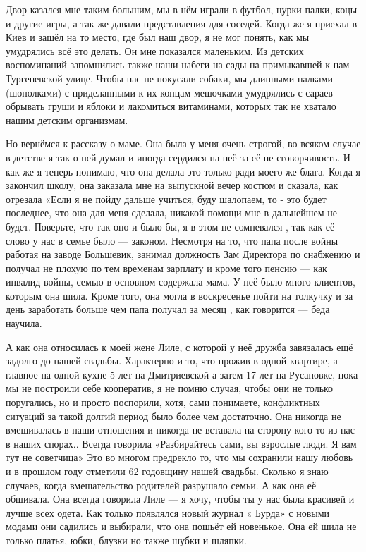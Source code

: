 Двор казался мне таким большим, мы в нём играли в футбол, цурки-палки, коцы и
другие игры,  а так же давали представления для соседей. Когда же я приехал в
Киев и зашёл на то место, где  был наш двор, я не мог понять, как мы
умудрялись всё это делать. Он мне показался маленьким. Из детских воспоминаний
запомнились также наши набеги на сады на примыкавшей к нам Тургеневской улице.
Чтобы нас не покусали собаки, мы длинными палками (шополками) с приделанными к
их концам мешочками умудрялись с сараев  обрывать груши и яблоки  и лакомиться
витаминами, которых так не хватало нашим детским организмам.

Но вернёмся к рассказу о маме. Она была у меня очень строгой, во всяком случае
в детстве я так о ней думал и иногда сердился на неё за её не сговорчивость. И
как же я теперь понимаю, что она  делала это только ради моего же блага.  Когда
я закончил школу, она заказала мне на выпускной вечер костюм и сказала, как
отрезала «Если я не пойду дальше учиться, буду шалопаем, то - это  будет
последнее, что она для меня сделала, никакой помощи мне в дальнейшем  не будет.
Поверьте, что так оно и было бы, я в этом не сомневался , так как её слово у
нас в семье было — законом. Несмотря на то, что папа после войны работая на
заводе Большевик, занимал должность Зам Директора по снабжению  и получал не
плохую по тем временам  зарплату и кроме того пенсию — как инвалид войны, семью
в основном содержала мама.  У неё было много клиентов, которым она шила. Кроме
того, она могла в воскресенье пойти на толкучку и за день заработать больше
чем папа  получал за месяц , как говорится — беда научила.

А как она относилась к моей жене Лиле, с которой у неё дружба завязалась ещё
задолго до нашей свадьбы. Характерно и то, что прожив в одной квартире, а
главное  на одной кухне 5 лет на Дмитриевской а затем 17 лет на Русановке, пока
мы не построили себе кооператив, я не помню случая, чтобы они не только
поругались, но и  просто поспорили, хотя, сами понимаете, конфликтных ситуаций
за такой долгий период было более чем  достаточно. Она  никогда не вмешивалась
в наши отношения и никогда не вставала на сторону кого то из нас в наших
спорах..  Всегда говорила «Разбирайтесь сами,  вы взрослые люди. Я вам тут не
советчица»  Это во многом предрекло то, что мы сохранили нашу любовь и в
прошлом году отметили 62 годовщину нашей свадьбы. Сколько я знаю случаев, когда
вмешательство  родителей  разрушало семьи.  А как она её обшивала. Она всегда
говорила Лиле — я хочу, чтобы ты у нас была красивей и лучше  всех одета. Как
только появлялся новый журнал « Бурда» с новыми модами они садились и выбирали,
что она пошьёт  ей новенькое.  Она ей шила не только платья, юбки, блузки  но
также  шубки и шляпки.  

